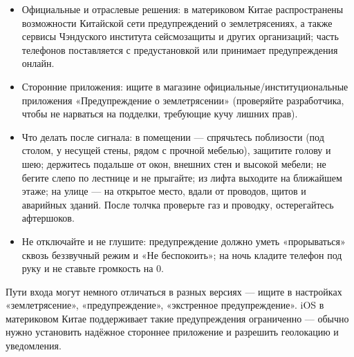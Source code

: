 \begin{itemize}
  \item Официальные и отраслевые решения: в материковом Китае распространены возможности Китайской сети предупреждений о землетрясениях, а также сервисы Чэндуского института сейсмозащиты и других организаций; часть телефонов поставляется с предустановкой или принимает предупреждения онлайн.
  \item Сторонние приложения: ищите в магазине официальные/институциональные приложения «Предупреждение о землетрясении» (проверяйте разработчика, чтобы не нарваться на подделки, требующие кучу лишних прав).
  \item Что делать после сигнала: в помещении — спрячьтесь поблизости (под столом, у несущей стены, рядом с прочной мебелью), защитите голову и шею; держитесь подальше от окон, внешних стен и высокой мебели; не бегите слепо по лестнице и не прыгайте; из лифта выходите на ближайшем этаже; на улице — на открытое место, вдали от проводов, щитов и аварийных зданий. После толчка проверьте газ и проводку, остерегайтесь афтершоков.
  \item Не отключайте и не глушите: предупреждение должно уметь «прорываться» сквозь беззвучный режим и «Не беспокоить»; на ночь кладите телефон под руку и не ставьте громкость на 0.
\end{itemize}


Пути входа могут немного отличаться в разных версиях — ищите в настройках «землетрясение», «предупреждение», «экстренное предупреждение». iOS в материковом Китае поддерживает такие предупреждения ограниченно — обычно нужно установить надёжное стороннее приложение и разрешить геолокацию и уведомления.

